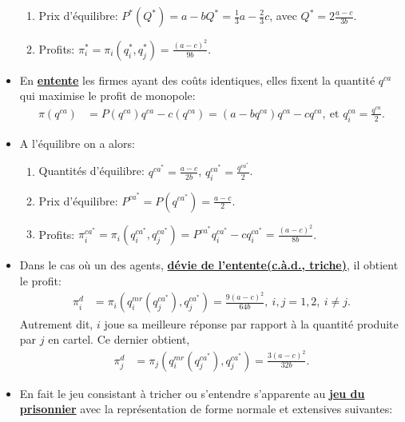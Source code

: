 \begin{frame}[allowframebreaks]{\insertsection}
\begin{itemize}
\begin{enumerate}[-]
        \item Prix d'équilibre: $P^*(Q^*) = a - b Q^* = \frac{1}{3}a - \frac{2}{3}c$, avec $Q^* = 2 \frac{a-c}{3b}$.
        \item Profits: $\pi_i^* = \pi_i(q_i^*, q_j^*) = \frac{(a-c)^2}{9b}$.
    \end{enumerate}
    \framebreak
    \item En \textbf{\underline{entente}} les firmes ayant des coûts identiques, elles fixent la quantité $q^{ca}$ qui maximise le profit de monopole:
    \begin{align*}
        \pi(q^{ca}) &= P(q^{ca})q^{ca} - c(q^{ca}) = (a-b q^{ca})q^{ca} - cq^{ca}, \ \text{et $q_i^{ca} = \frac{q^{ca}}{2}$}.
    \end{align*}
    \item A l'équilibre on a alors:
    \begin{enumerate}[-]
        \item Quantités d'équilibre: $q^{ca^*} = \frac{a-c}{2b}$, $q_i^{ca^*} = \frac{q^{ca^*}}{2}$.
        \item Prix d'équilibre: $P^{ca^*} = P(q^{ca^*}) = \frac{a-c}{2}$.
        \item Profits: $\pi_i^{ca^*} = \pi_i(q_i^{ca^*}, q_j^{ca^*}) = P^{ca^*} q_i^{ca^*} - c q_i^{ca^*} = \frac{(a-c)^2}{8b}$.
    \end{enumerate}

    \framebreak
    \item Dans le cas où un des agents, \textbf{\underline{dévie de l'entente(c.à.d., triche)}}, il obtient le profit:
    \begin{align*}
     \pi_i^d &= \pi_i\left(q_i^{mr}(q_j^{ca^*}), q_j^{ca^*}\right) = \frac{9(a-c)^2}{64b}, \ i, j=1, 2, \ i\neq j.
    \end{align*}
    Autrement dit, $i$ joue sa meilleure réponse par rapport à la quantité produite par $j$ en cartel. Ce dernier obtient, 
    \begin{align*}
        \pi_j^d&= \pi_j\left(q_i^{mr}(q_j^{ca^*}), q_j^{ca^*}\right) =\frac{3(a-c)^2}{32b}.
    \end{align*}

\framebreak

\item En fait le jeu consistant à tricher ou s'entendre s'apparente au
 \textbf{\underline{jeu du prisonnier}} avec la représentation de forme normale et extensives suivantes:




\end{itemize}
\end{frame}

